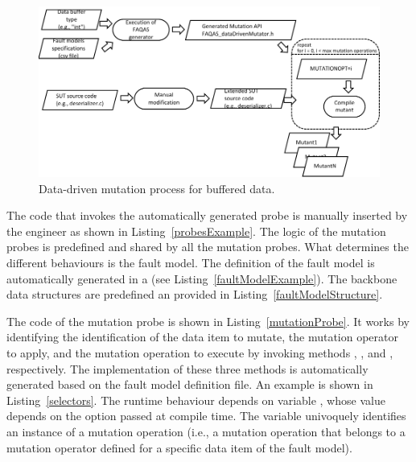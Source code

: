 \begin{figure}[tb]
  \centering
    \includegraphics{images/DataDrivenBufferProcess}
      \caption{Data-driven mutation process for buffered data.}
      \label{fig:DataDrivenBufferProcess}
\end{figure}

The code that invokes the automatically generated probe is manually inserted by the engineer as shown in Listing~\ref{probesExample}.
The logic of the mutation probes is predefined and shared by all the mutation probes. What determines the different behaviours is the fault model.
The definition of the fault model is automatically generated in a  (see Listing~\ref{faultModelExample}). 
The backbone data structures are predefined an provided in Listing~\ref{faultModelStructure}.

The code of the mutation probe is shown in Listing~\ref{mutationProbe}. It works by identifying the identification of the data item to mutate, the mutation operator to apply, and the mutation operation to execute by invoking methods ,
, and , respectively. The implementation of these three methods is automatically generated based on the fault model definition file.
An example is shown in Listing~\ref{selectors}. The runtime behaviour depends on variable , whose value depends on the option passed at compile time. 
The variable  univoquely identifies an instance of a mutation operation (i.e., a mutation operation that belongs to a mutation operator defined for a specific data item of the fault model).










